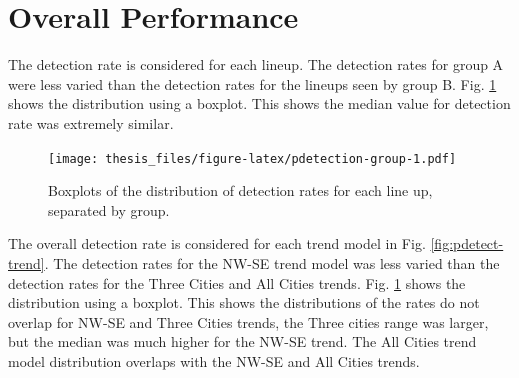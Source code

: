 \documentclass{monashthesis}
\begin{document}
\hypertarget{overall-performance}{%
\section{Overall Performance}\label{overall-performance}}

The detection rate is considered for each lineup. The detection rates for group A were less varied than the detection rates for the lineups seen by group B. Fig. \ref{fig:pdetection-group} shows the distribution using a boxplot. This shows the median value for detection rate was extremely similar.

\begin{Shaded}
\end{Shaded}

\begin{figure}
\centering
\texttt{[image: thesis\_files/figure-latex/pdetection-group-1.pdf]}
\caption{\label{fig:pdetection-group}Boxplots of the distribution of detection rates for each line up, separated by group.}
\end{figure}

The overall detection rate is considered for each trend model in Fig. \ref{fig:pdetect-trend}.
The detection rates for the NW-SE trend model was less varied than the detection rates for the Three Cities and All Cities trends. Fig. \ref{fig:pdetection-group} shows the distribution using a boxplot. This shows the distributions of the rates do not overlap for NW-SE and Three Cities trends, the Three cities range was larger, but the median was much higher for the NW-SE trend. The All Cities trend model distribution overlaps with the NW-SE and All Cities trends.
\end{document}
